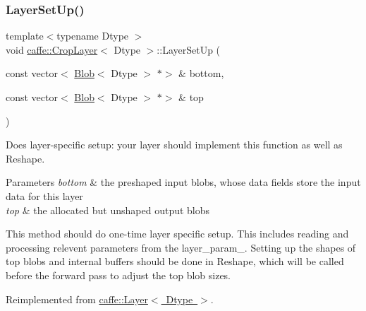 \subsubsection{\texorpdfstring{Layer\+Set\+Up()}{LayerSetUp()}\hspace{0.1cm}{\footnotesize\ttfamily [1/2]}}
{\footnotesize\ttfamily template$<$typename Dtype $>$ \\
void \mbox{\hyperlink{classcaffe_1_1_crop_layer}{caffe\+::\+Crop\+Layer}}$<$ Dtype $>$\+::Layer\+Set\+Up (\begin{DoxyParamCaption}\item[{const vector$<$ \mbox{\hyperlink{classcaffe_1_1_blob}{Blob}}$<$ Dtype $>$ $\ast$$>$ \&}]{bottom,  }\item[{const vector$<$ \mbox{\hyperlink{classcaffe_1_1_blob}{Blob}}$<$ Dtype $>$ $\ast$$>$ \&}]{top }\end{DoxyParamCaption})\hspace{0.3cm}{\ttfamily [virtual]}}



Does layer-\/specific setup\+: your layer should implement this function as well as Reshape. 


\begin{DoxyParams}{Parameters}
{\em bottom} & the preshaped input blobs, whose data fields store the input data for this layer \\
\hline
{\em top} & the allocated but unshaped output blobs\\
\hline
\end{DoxyParams}
This method should do one-\/time layer specific setup. This includes reading and processing relevent parameters from the {\ttfamily layer\+\_\+param\+\_\+}. Setting up the shapes of top blobs and internal buffers should be done in {\ttfamily Reshape}, which will be called before the forward pass to adjust the top blob sizes. 

Reimplemented from \mbox{\hyperlink{classcaffe_1_1_layer_a481323a3e0972c682787f2137468c29f}{caffe\+::\+Layer$<$ Dtype $>$}}.

\mbox{\label{classcaffe_1_1_crop_layer_ad4858525eae95a2526b11e20f46d6c3f}} 
